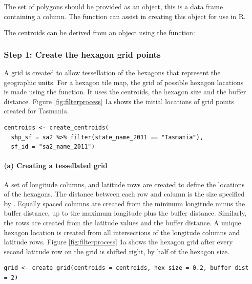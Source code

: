 The set of polygons should be provided as an  object, this is a data frame containing a  column. The  function can assist in creating this object for use in R.

The centroids can be derived from an  object using the  function:

\hypertarget{step-1-create-the-hexagon-grid-points}{%
\subsubsection{Step 1: Create the hexagon grid points}\label{step-1-create-the-hexagon-grid-points}}

A grid is created to allow tessellation of the hexagons that represent the geographic units. For a hexagon tile map, the grid of possible hexagon locations is made using the  function. It uses the centroids, the hexagon size and the buffer distance. Figure \ref{fig:filterprocess} 1a shows the initial locations of grid points created for Tasmania.

\begin{verbatim}
centroids <- create_centroids(
  shp_sf = sa2 %>% filter(state_name_2011 == "Tasmania"), 
  sf_id = "sa2_name_2011")
\end{verbatim}

\hypertarget{a-creating-a-tessellated-grid}{%
\paragraph{(a) Creating a tessellated grid}\label{a-creating-a-tessellated-grid}}

A set of longitude columns, and latitude rows are created to define the locations of the hexagons. The distance between each row and column is the size specified by . Equally spaced columns are created from the minimum longitude minus the buffer distance, up to the maximum longitude plus the buffer distance. Similarly, the rows are created from the latitude values and the buffer distance. A unique hexagon location is created from all intersections of the longitude columns and latitude rows. Figure \ref{fig:filterprocess} 1a shows the hexagon grid after every second latitude row on the grid is shifted right, by half of the hexagon size.

\begin{verbatim}
grid <- create_grid(centroids = centroids, hex_size = 0.2, buffer_dist = 2)
\end{verbatim}

